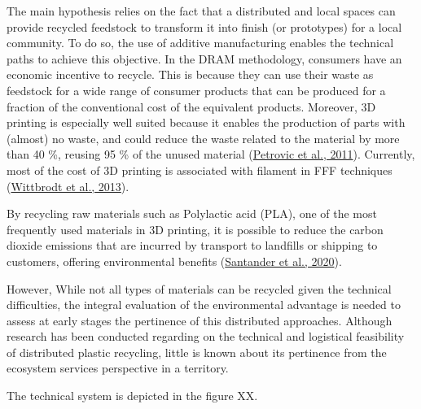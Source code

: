 \documentclass[]{elsarticle} %
\begin{document}
The main hypothesis relies on the fact that a distributed and local spaces can provide recycled feedstock to transform it into finish (or prototypes) for a local community.
To do so, the use of additive manufacturing enables the technical paths to achieve this objective.
In the DRAM methodology, consumers have an economic incentive to recycle.
This is because they can use their waste as feedstock for a wide range of consumer products that can be produced for a fraction of the conventional cost of the equivalent products.
Moreover, 3D printing is especially well suited because it enables the production of parts with (almost) no waste, and could reduce the waste related to the material by more than 40 \%, reusing 95 \% of the unused material (\protect\hyperlink{ref-Petrovic2011}{Petrovic et al., 2011}).
Currently, most of the cost of 3D printing is associated with filament in FFF techniques (\protect\hyperlink{ref-Wittbrodt2013}{Wittbrodt et al., 2013}).

By recycling raw materials such as Polylactic acid (PLA), one of the most frequently used materials in 3D printing, it is possible to reduce the carbon dioxide emissions that are incurred by transport to landfills or shipping to customers, offering environmental benefits (\protect\hyperlink{ref-Santander2020}{Santander et al., 2020}).

However, While not all types of materials can be recycled given the technical difficulties, the integral evaluation of the environmental advantage is needed to assess at early stages the pertinence of this distributed approaches.
Although research has been conducted regarding on the technical and logistical feasibility of distributed plastic recycling, little is known about its pertinence from the ecosystem services perspective in a territory.

The technical system is depicted in the figure XX.
\end{document}
